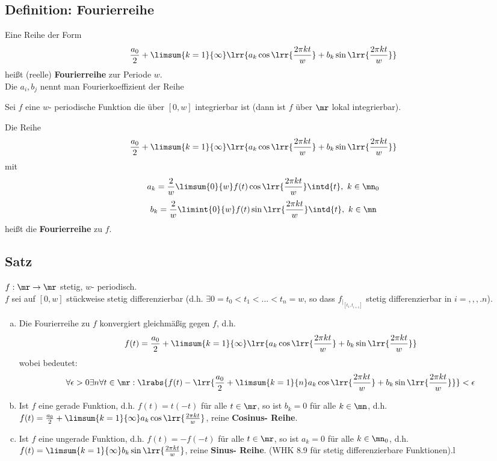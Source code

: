 \subsection{Definition: Fourierreihe}
	\item Eine Reihe der Form
	\[\dfrac{a_0}{2}+\limsum{k=1}{\infty}\lrr{a_k\cos\lrr{\frac{2\pi kt}{w}}+b_k\sin\lrr{\dfrac{2\pi kt}{w}}}\]
	heißt (reelle) \textbf{Fourierreihe} zur Periode $ w $.\\
	Die $ a_i,b_j $ nennt man Fourierkoeffizient der Reihe
	\item Sei $ f $ eine $ w $- periodische Funktion die über $ [0,w] $ integrierbar ist (dann ist $ f $ über $ \mr $ lokal integrierbar).
	
	Die Reihe
	\[\dfrac{a_0}{2}+\limsum{k=1}{\infty}\lrr{a_k\cos\lrr{\frac{2\pi kt}{w}}+b_k\sin\lrr{\dfrac{2\pi kt}{w}}}\]
	mit
	\[a_k=\frac{2}{w}\limsum{0}{w}f(t)\cos\lrr{\dfrac{2\pi kt}{w}}\intd{t},\ k\in\mn_0\]
	\[b_k=\frac{2}{w}\limint{0}{w}f(t)\sin\lrr{\dfrac{2\pi kt}{w}}\intd{t},\ k\in\mn\]
	heißt die \textbf{Fourierreihe} zu $ f $.
	\subExEnd
	
\subsection{Satz}
	$ f:\mr\rightarrow\mr $ stetig, $ w $- periodisch.\\
	$ f $ sei auf $[0,w]$ stückweise stetig differenzierbar (d.h. $\exists 0=t_0<t_1<...<t_n=w$, so dass $f_{|_{[t_1,t_{i+1}]}}$ stetig differenzierbar in $i=,,,.n$).
	\begin{enumerate}[a)]
	\item Die Fourierreihe zu $f$ konvergiert gleichmäßig gegen $f$, d.h.
	\[f(t)=\dfrac{a_0}{2}+\limsum{k=1}{\infty}\lrr{a_k\cos\lrr{\dfrac{2\pi kt}{w}}+b_k\sin\lrr{\dfrac{2\pi kt}{w}}}\]
	wobei  bedeutet: \[\forall\epsilon>0\exists n\forall t\in\mr: \lrabs{f(t)-\lrr{\dfrac{a_0}{2}+\limsum{k=1}{n}a_k\cos\lrr{\dfrac{2\pi kt}{w}}+b_k\sin\lrr{\dfrac{2\pi kt}{w}}}}<\epsilon\]
	\item Ist $f$ eine gerade Funktion, d.h. $f(t)=t(-t)$ für alle $t\in\mr$, so ist $b_k=0$ für alle $k\in\mn$, d.h. $f(t)=\frac{a_0}{2}+\limsum{k=1}{\infty}a_k\cos\lrr{\frac{2\pi kt}{w}}$, reine \textbf{Cosinus- Reihe}.
	\item Ist $f$ eine ungerade Funktion, d.h. $f(t)=-f(-t)$ für alle $t\in\mr$, so ist $a_k=0$ für alle $k\in\mn_0$, d.h. $f(t)=\limsum{k=1}{\infty}b_k\sin\lrr{\frac{2\pi kt}{w}}$, reine \textbf{Sinus- Reihe}. (WHK 8.9 für stetig differenzierbare Funktionen).l
	\end{enumerate}
	
